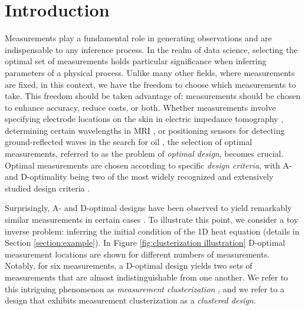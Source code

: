 \section{Introduction}\label{section:intro}
Measurements play a fundamental role in generating observations and
are indispensable to any inference process. In the realm of data
science, selecting the optimal set of measurements holds particular
significance when inferring parameters of a physical process. Unlike
many other fields, where measurements are fixed, in this context, we
have the freedom to choose which measurements to take. This freedom
should be taken advantage of: measurements should be chosen to enhance
accuracy, reduce costs, or both. Whether measurements involve
specifying electrode locations on the skin in electric impedance
tomography \cite{horesh2010impedance}, determining certain wavelengths
in MRI \cite{horesh2008mri}, or positioning sensors for detecting
ground-reflected waves in the search for oil
\cite{horesh2008borehole}, the selection of optimal measurements,
referred to as the problem of \emph{optimal design}, becomes
crucial. Optimal measurements are chosen according to specific
\emph{design criteria}, with A- and D-optimality being two of the most
widely recognized and extensively studied design criteria
\cite{Chaloner1995}.


Surprisingly, A- and D-optimal designs have been observed to yield
remarkably similar measurements in certain cases \cite{fedorov1996,
  hooker2009, fedorov2012, Ucinski05, neitzel2019sparse}. To
illustrate this point, we consider a toy inverse problem: inferring
the initial condition of the 1D heat equation (details in Section
\ref{section:example}). In Figure \ref{fig:clusterization
  illustration} D-optimal measurement locations are shown for
different numbers of measurements. Notably, for six measurements, a
D-optimal design yields two sets of measurements that are almost
indistinguishable from one another. We refer to this intriguing
phenomenon as \emph{measurement clusterization} \cite{Ucinski05}, and
we refer to a design that exhibits measurement clusterization as a
\emph{clustered design}.


